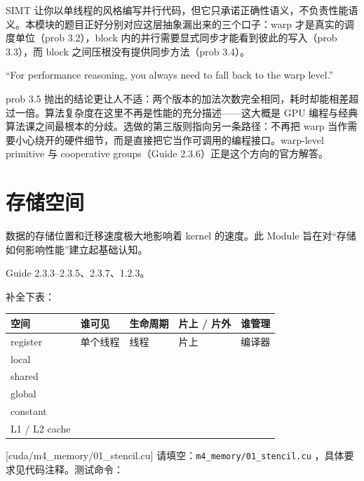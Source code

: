 \documentclass[11pt,a4paper,fontset=none]{ctexart}
\begin{document}
\begin{lookback}
SIMT 让你以单线程的风格编写并行代码，但它只承诺正确性语义，不负责性能语义。本模块的题目正好分别对应这层抽象漏出来的三个口子：warp 才是真实的调度单位（prob 3.2），block 内的并行需要显式同步才能看到彼此的写入（prob 3.3），而 block 之间压根没有提供同步方法（prob 3.4）。

``For performance reasoning, you always need to fall back to the warp level.''

prob 3.5 抛出的结论更让人不适：两个版本的加法次数完全相同，耗时却能相差超过一倍。算法复杂度在这里不再是性能的充分描述——这大概是 GPU 编程与经典算法课之间最根本的分歧。选做的第三版则指向另一条路径：不再把 warp 当作需要小心绕开的硬件细节，而是直接把它当作可调用的编程接口。warp-level primitive 与 cooperative groups（Guide 2.3.6）正是这个方向的官方解答。
\end{lookback}

\section{存储空间}

数据的存储位置和迁移速度极大地影响着 kernel 的速度。此 Module 旨在对“存储如何影响性能”建立起基础认知。

\begin{reading}
Guide 2.3.3--2.3.5、2.3.7、1.2.3。
\end{reading}

补全下表：

\begin{center}\small
\begin{tabular}{@{}lp{8em}p{7em}p{6em}p{8em}@{}}
\toprule
空间 & 谁可见 & 生命周期 & 片上 / 片外 & 谁管理 \\
\midrule
register & 单个线程 & 线程 & 片上 & 编译器 \\
local &  &  &  &  \\
shared &  &  &  &  \\
global &  &  &  &  \\
constant &  &  &  &  \\
L1 / L2 cache &  &  &  &  \\
\bottomrule
\end{tabular}
\end{center}

[cuda/m4\_memory/01\_stencil.cu]
请填空：\texttt{m4\_memory/01\_stencil.cu} ，具体要求见代码注释。测试命令：
\end{document}

